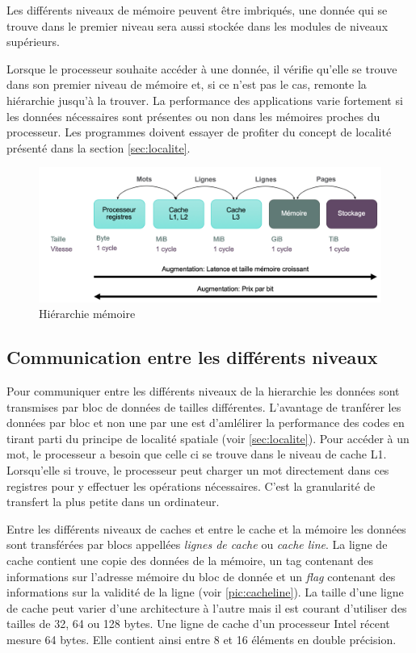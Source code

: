Les différents niveaux de mémoire peuvent être imbriqués, une donnée qui se trouve dans le premier niveau sera aussi stockée dans les modules de niveaux supérieurs.

Lorsque le processeur souhaite accéder à une donnée, il vérifie qu'elle se trouve dans son premier niveau de mémoire et, si ce n'est pas le cas, remonte la hiérarchie jusqu'à la trouver. La performance des applications varie fortement si les données nécessaires sont présentes ou non dans les mémoires proches du processeur. Les programmes doivent essayer de profiter du concept de localité présenté dans la section \autoref{sec:localite}.
\begin{figure}
    \center
    \includegraphics[width=14cm]{images/memory_hierarchy.png}
    \caption{\label{pic:cpuvsmemory} Hiérarchie mémoire}
\end{figure}





\subsection{Communication entre les différents niveaux}
Pour communiquer entre les différents niveaux de la hierarchie les données sont transmises par bloc de données de tailles différentes. L'avantage de tranférer les données par bloc et non une par une est d'amlélirer la performance des codes en tirant parti du principe de localité spatiale (voir \autoref{sec:localite}).
Pour accéder à un mot, le processeur a besoin que celle ci se trouve dans le niveau de cache L1. Lorsqu'elle si trouve, le processeur peut charger un mot directement dans ces registres pour y effectuer les opérations nécessaires. C'est la granularité de transfert la plus petite dans un ordinateur. 

Entre les différents niveaux de caches et entre le cache et la mémoire les données sont transférées par blocs appellées \textit{lignes de cache} ou \textit{cache line}. La ligne de cache contient une copie des données de la mémoire, un tag contenant des informations sur l'adresse mémoire du bloc de donnée et un \textit{flag} contenant des informations sur la validité de la ligne (voir \autoref{pic:cacheline}). La taille d'une ligne de cache peut varier d'une architecture à l'autre mais il est courant d'utiliser des tailles de 32, 64 ou 128 bytes. Une ligne de cache d'un processeur Intel récent mesure 64 bytes. Elle contient ainsi entre 8 et 16 éléments en double précision. 

